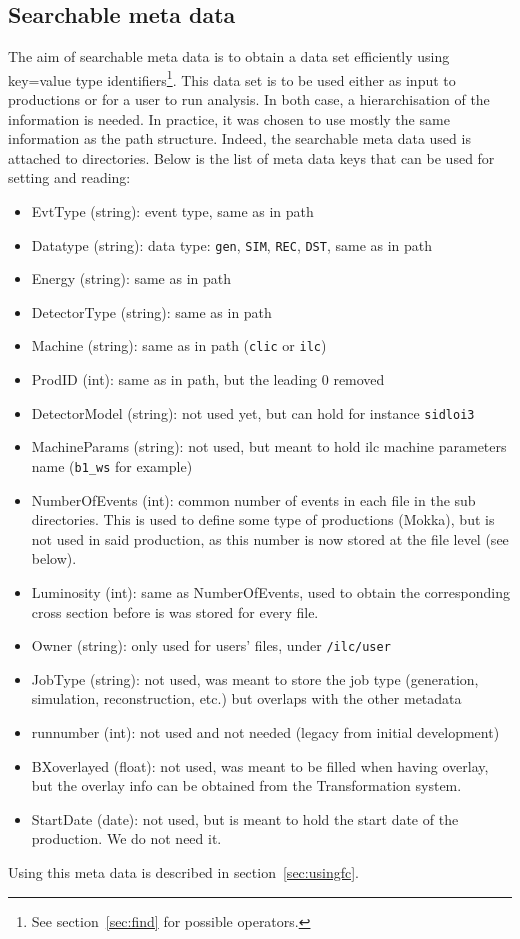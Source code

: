 \documentclass[11pt,a4paper]{scrartcl}
\begin{document}
\subsection{Searchable meta data}
The aim of searchable meta data is to obtain a data set efficiently using
key=value type identifiers\footnote{See section~\ref{sec:find} for possible
operators.}. This data set is to be used either as input to productions or for a
user to run analysis. In both case, a hierarchisation  of the information is needed. In practice, it was chosen to
use mostly the same information as the path structure. Indeed, the searchable
meta data used is attached to directories. Below is the list of meta data keys 
that can be used for setting and reading:
\begin{itemize}
  \item EvtType (string): event type, same as in path
  \item Datatype (string): data type: \lstinline|gen|, \lstinline|SIM|,
  \lstinline|REC|, \lstinline|DST|, same as in path
  \item Energy (string): same as in path
  \item DetectorType (string): same as in path
  \item Machine (string): same as in path (\lstinline|clic| or \lstinline|ilc|)
  \item ProdID (int): same as in path, but the leading 0 removed
  \item DetectorModel (string): not used yet, but can hold for instance
  \lstinline|sidloi3|
  \item MachineParams (string): not used, but meant to hold ilc machine
  parameters name (\lstinline|b1_ws| for example)
  \item NumberOfEvents (int): common number of events in each file in the sub
  directories. This is used to define some type of productions (Mokka), but is
  not used in said production, as this number is now stored at the file level
  (see below).
  \item Luminosity (int): same as NumberOfEvents, used to obtain the
  corresponding cross section before is was stored for every file.
  \item Owner (string): only used for users' files, under \lstinline|/ilc/user|
  \item JobType (string): not used, was meant to store the job type
  (generation, simulation, reconstruction, etc.) but overlaps with the other
  metadata
  \item runnumber (int): not used and not needed (legacy from initial
  development)
  \item BXoverlayed (float): not used, was meant to be filled when having
  overlay, but the overlay info can be obtained from the Transformation system. 
  \item StartDate (date): not used, but is meant to hold the start date of the
  production. We do not need it.
\end{itemize}
Using this meta data is described in section~\ref{sec:usingfc}. 
\end{document}
